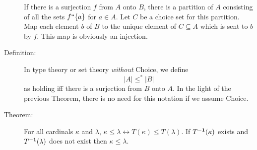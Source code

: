 \documentclass[12pt]{book}
\begin{document}
\begin{description}
If there is a surjection $f$ from $A$ onto $B$, there is a partition
of $A$ consisting of all the sets $f``\{a\}$ for $a \in A$.  Let $C$
be a choice set for this partition.  Map each element $b$ of $B$ to
the unique element of $C\subseteq A$ which is sent to $b$ by $f$.
This map is obviously an injection.

\newpage

\item[Definition:] In type theory or set theory {\em without\/}
Choice, we define $$|A| \leq^* |B|$$ as holding iff there is a surjection
from $B$ onto $A$.  In the light of the previous Theorem, there is no
need for this notation if we assume Choice.

\item[Theorem:] For all cardinals $\kappa$ and
$\lambda$, $\kappa \leq \lambda \leftrightarrow T(\kappa) \leq T(\lambda)$.  If
$T^{\bf -1}(\kappa)$ exists and $T^{\bf -1}(\lambda)$ does not exist then
$\kappa\leq \lambda$.

\end{description}
\end{document}
